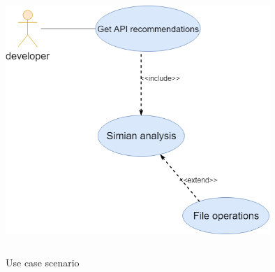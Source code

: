 \begin{figure}[!h]
\includegraphics[width=10cm,height=10cm,keepaspectratio]{images/Usecase.png}
\centering
\caption{Use case scenario}
\label{fig:cmd}
\end{figure}

